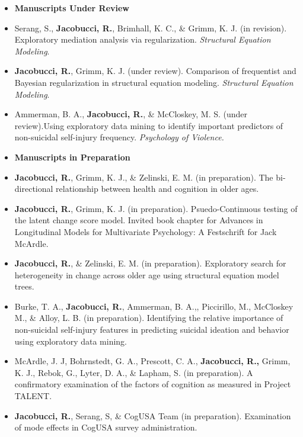 \documentclass[letterpaper,10pt]{article}
\begin{document}
\begin{itemize}
%
\item {\textbf{\large{Manuscripts Under Review}}}
%
\item[]Serang, S., \textbf{Jacobucci, R.}, Brimhall, K. C., \& Grimm, K. J. (in revision). Exploratory mediation analysis via regularization. \emph{Structural Equation Modeling}.
%
\item[] \textbf{Jacobucci, R.}, Grimm, K. J. (under review). Comparison of frequentist and Bayesian regularization in structural equation modeling. \emph{Structural Equation Modeling}.
%
\item[]Ammerman, B. A., \textbf{Jacobucci, R.}, \& McCloskey, M. S. (under review).Using exploratory data mining to identify important predictors of non-suicidal self-injury frequency. \emph{Psychology of Violence.}
%
\item{\textbf{\large{Manuscripts in Preparation}}} 
%
\item[] \textbf{Jacobucci, R.}, Grimm, K. J., \& Zelinski, E. M. (in preparation). The bi-directional relationship between health and cognition in older ages. 
%
\item[] \textbf{Jacobucci, R.}, Grimm, K. J. (in preparation). Psuedo-Continuous testing of the latent change score model. Invited book chapter for Advances in Longitudinal Models for Multivariate Psychology: A Festschrift for Jack McArdle.
%
\item[] \textbf{Jacobucci, R.}, \& Zelinski, E. M. (in preparation).  
Exploratory search for heterogeneity in change across older age using structural equation model trees.
%
\item[]Burke, T. A., \textbf{Jacobucci, R.}, Ammerman, B. A.,, Piccirillo, M., McCloskey M., \& Alloy, L. B. (in preparation). Identifying the relative importance of non-suicidal self-injury features in predicting suicidal ideation and behavior using exploratory data mining.
%
\item[]McArdle, J. J, Bohrnstedt, G. A., Prescott, C. A., \textbf{Jacobucci, R.,} Grimm, K. J., Rebok, G., Lyter, D. A., \& Lapham, S. (in preparation). A confirmatory examination of the factors of cognition as measured in Project TALENT.%
%
\item[] \textbf{Jacobucci, R.}, Serang, S, \& CogUSA Team (in preparation). Examination of mode effects in CogUSA survey administration.


\end{itemize} 
\end{document}
